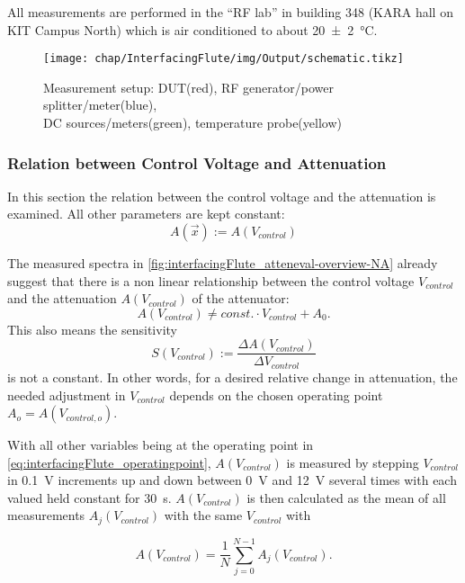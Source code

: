 All measurements are performed in the ``RF lab'' in building 348 (KARA hall on KIT Campus North) which is air conditioned to about \SI{20(2)}{\celsius}.

\begin{figure}[tb]
	\centering
	\texttt{[image: chap/InterfacingFlute/img/Output/schematic.tikz]}
	\caption{Measurement setup: DUT(red), RF generator/power splitter/meter(blue),\\ DC sources/meters(green), temperature probe(yellow)}
	\label{fig:interfacingFlute_atteneval-setup}
\end{figure}

\subsubsection{Relation between Control Voltage and Attenuation}
In this section the relation between the control voltage and the attenuation is examined. All other parameters are kept constant:
\begin{equation}
A(\vec{x}) := A(V_{control})
\end{equation}

The measured spectra in \autoref{fig:interfacingFlute_atteneval-overview-NA} already suggest that there is a non linear relationship between the control voltage $V_{control}$ and the attenuation $A(V_{control})$ of the attenuator:
\begin{equation}
A(V_{control}) \neq const. \cdot V_{control} + A_0.
\end{equation}
This also means the sensitivity
\begin{equation}
S(V_{control}) := \frac{\Delta A(V_{control})}{\Delta V_{control}}
\end{equation}
is not a constant.
In other words, for a desired relative change in attenuation, the needed adjustment in $V_{control}$ depends on the chosen operating point $A_o=A(V_{control,o})$.

With all other variables being at the operating point in \autoref{eq:interfacingFlute_operatingpoint}, $A(V_{control})$ is measured by stepping $V_{control}$ in \SI{0.1}{\volt} increments up and down between \SI{0}{\volt} and \SI{12}{\volt} several times with each valued held constant for \SI{30}{\second}. $A(V_{control})$ is then calculated as the mean of all measurements $A_j(V_{control})$ with the same $V_{control}$ with

\begin{equation}\label{eq:interfacingFlute_avg}
A(V_{control}) = \frac{1}{N} \sum_{j=0}^{N-1} A_j(V_{control}).
\end{equation}


